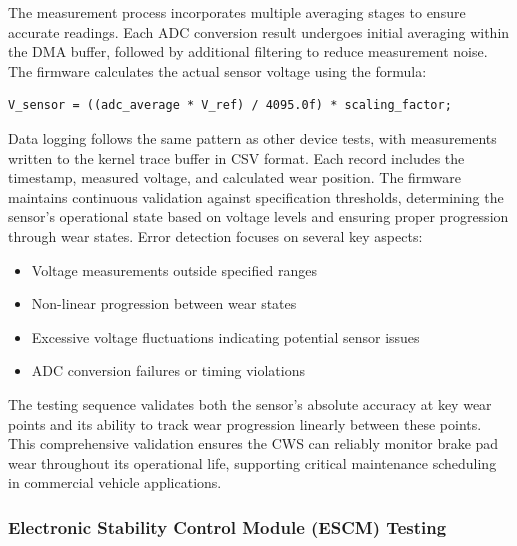 \documentclass[12pt]{article}
\begin{document}
The measurement process incorporates multiple averaging stages to ensure accurate readings. Each ADC conversion result undergoes initial averaging within the DMA buffer, followed by additional filtering to reduce measurement noise. The firmware calculates the actual sensor voltage using the formula:
\begin{verbatim}
V_sensor = ((adc_average * V_ref) / 4095.0f) * scaling_factor;
\end{verbatim}
Data logging follows the same pattern as other device tests, with measurements written to the kernel trace buffer in CSV format. Each record includes the timestamp, measured voltage, and calculated wear position. The firmware maintains continuous validation against specification thresholds, determining the sensor's operational state based on voltage levels and ensuring proper progression through wear states.
Error detection focuses on several key aspects:
\begin{itemize}
\item Voltage measurements outside specified ranges
\item Non-linear progression between wear states
\item Excessive voltage fluctuations indicating potential sensor issues
\item ADC conversion failures or timing violations
\end{itemize}
The testing sequence validates both the sensor's absolute accuracy at key wear points and its ability to track wear progression linearly between these points. This comprehensive validation ensures the CWS can reliably monitor brake pad wear throughout its operational life, supporting critical maintenance scheduling in commercial vehicle applications.

\subsubsection{Electronic Stability Control Module (ESCM) Testing}
\end{document}
